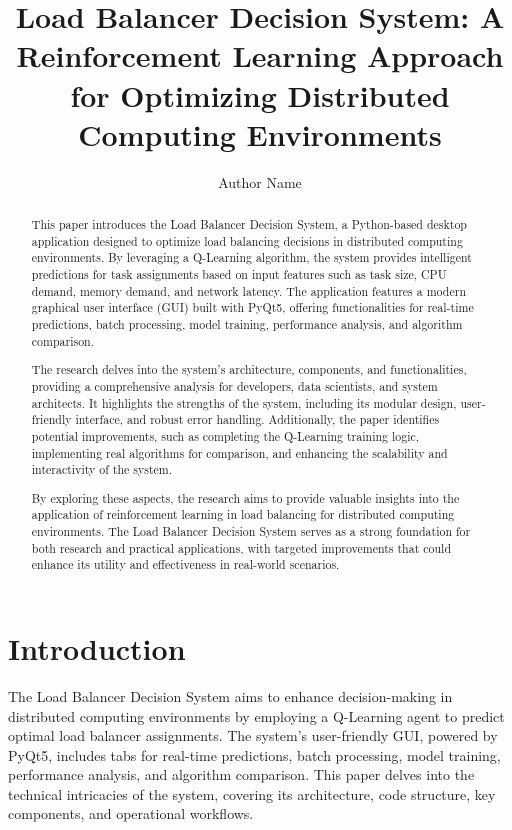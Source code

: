 \documentclass[runningheads]{llncs}
\title{Load Balancer Decision System: A Reinforcement Learning Approach for Optimizing Distributed Computing Environments}
\author{Author Name}
\institute{Affiliation, Address, City, Country \\ \email{author@example.com}}
\begin{document}
\maketitle

\begin{abstract}
This paper introduces the Load Balancer Decision System, a Python-based desktop application designed to optimize load balancing decisions in distributed computing environments. By leveraging a Q-Learning algorithm, the system provides intelligent predictions for task assignments based on input features such as task size, CPU demand, memory demand, and network latency. The application features a modern graphical user interface (GUI) built with PyQt5, offering functionalities for real-time predictions, batch processing, model training, performance analysis, and algorithm comparison.

The research delves into the system's architecture, components, and functionalities, providing a comprehensive analysis for developers, data scientists, and system architects. It highlights the strengths of the system, including its modular design, user-friendly interface, and robust error handling. Additionally, the paper identifies potential improvements, such as completing the Q-Learning training logic, implementing real algorithms for comparison, and enhancing the scalability and interactivity of the system.

By exploring these aspects, the research aims to provide valuable insights into the application of reinforcement learning in load balancing for distributed computing environments. The Load Balancer Decision System serves as a strong foundation for both research and practical applications, with targeted improvements that could enhance its utility and effectiveness in real-world scenarios.
\end{abstract}

\section{Introduction}
The Load Balancer Decision System aims to enhance decision-making in distributed computing environments by employing a Q-Learning agent to predict optimal load balancer assignments. The system's user-friendly GUI, powered by PyQt5, includes tabs for real-time predictions, batch processing, model training, performance analysis, and algorithm comparison. This paper delves into the technical intricacies of the system, covering its architecture, code structure, key components, and operational workflows.
\end{document}
